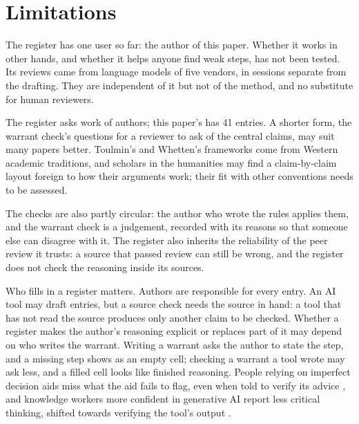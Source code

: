 \documentclass[12pt, a4paper]{article}
\begin{document}
\section{Limitations}
\label{sec:limits}

The register has one user so far: the author of this paper.  Whether
it works in other hands, and whether it helps anyone find weak steps,
has not been tested.  Its
reviews came from language models of five vendors, in sessions
separate from the drafting.  They are independent of it but not of the method, and no substitute
for human reviewers.

The register asks work of authors; this paper's has 41 entries.
A shorter form, the warrant check's questions for a reviewer to ask of
the central claims, may suit many papers better.  Toulmin's and
Whetten's frameworks come from Western academic traditions, and
scholars in the humanities may find a claim-by-claim layout foreign to
how their arguments work; their fit with other conventions needs to be
assessed.

The checks are also partly circular: the author who wrote the rules
applies them, and the warrant check is a judgement, recorded with its
reasons so that someone else can disagree with it.
The register also inherits the reliability of the peer review it
trusts: a source that passed review can still be wrong, and the
register does not check the reasoning inside its sources.

Who fills in a register matters.  Authors are responsible for every
entry.  An AI tool may draft
entries, but a
source check needs the source in hand: a tool that has not read the
source produces only another claim to be checked.
Whether a register
makes the author's reasoning explicit or replaces part of it may depend
on who writes the warrant.  Writing a warrant asks the author to state
the step, and a missing step shows as an empty cell; checking a warrant
a tool wrote may ask less, and a filled cell looks like finished
reasoning.  People relying on imperfect decision aids miss what the aid
fails to flag, even when told to verify its advice
\citep[pp.~391, 397]{parasuraman2010}, and knowledge workers more
confident in generative AI report less critical thinking, shifted
towards verifying the tool's output \citep[pp.~1, 9]{lee2025chi}.
\end{document}
